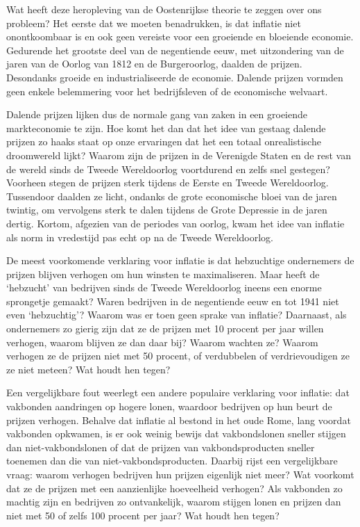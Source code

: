 \documentclass[
  a5paper,
  smalldemyvopaper,10pt,twoside,onecolumn,openright,extrafontsizes,hidelinks]{memoir}
\begin{document}
Wat heeft deze heropleving van de Oostenrijkse theorie te zeggen over
ons probleem? Het eerste dat we moeten benadrukken, is dat inflatie niet
onontkoombaar is en ook geen vereiste voor een groeiende en bloeiende
economie. Gedurende het grootste deel van de negentiende eeuw, met
uitzondering van de jaren van de Oorlog van 1812 en de Burgeroorlog,
daalden de prijzen. Desondanks groeide en industrialiseerde de economie.
Dalende prijzen vormden geen enkele belemmering voor het bedrijfsleven
of de economische welvaart.

Dalende prijzen lijken dus de normale gang van zaken in een groeiende
markteconomie te zijn. Hoe komt het dan dat het idee van gestaag dalende
prijzen zo haaks staat op onze ervaringen dat het een totaal
onrealistische droomwereld lijkt? Waarom zijn de prijzen in de Verenigde
Staten en de rest van de wereld sinds de Tweede Wereldoorlog voortdurend
en zelfs snel gestegen? Voorheen stegen de prijzen sterk tijdens de
Eerste en Tweede Wereldoorlog. Tussendoor daalden ze licht, ondanks de
grote economische bloei van de jaren twintig, om vervolgens sterk te
dalen tijdens de Grote Depressie in de jaren dertig. Kortom, afgezien
van de periodes van oorlog, kwam het idee van inflatie als norm in
vredestijd pas echt op na de Tweede Wereldoorlog.

De meest voorkomende verklaring voor inflatie is dat hebzuchtige
ondernemers de prijzen blijven verhogen om hun winsten te maximaliseren.
Maar heeft de `hebzucht' van bedrijven sinds de Tweede Wereldoorlog
ineens een enorme sprongetje gemaakt? Waren bedrijven in de negentiende
eeuw en tot 1941 niet even `hebzuchtig'? Waarom was er toen geen sprake
van inflatie? Daarnaast, als ondernemers zo gierig zijn dat ze de
prijzen met 10 procent per jaar willen verhogen, waarom blijven ze dan
daar bij? Waarom wachten ze? Waarom verhogen ze de prijzen niet met 50
procent, of verdubbelen of verdrievoudigen ze ze niet meteen? Wat houdt
hen tegen?

Een vergelijkbare fout weerlegt een andere populaire verklaring voor
inflatie: dat vakbonden aandringen op hogere lonen, waardoor bedrijven
op hun beurt de prijzen verhogen. Behalve dat inflatie al bestond in het
oude Rome, lang voordat vakbonden opkwamen, is er ook weinig bewijs dat
vakbondslonen sneller stijgen dan niet-vakbondslonen of dat de prijzen
van vakbondsproducten sneller toenemen dan die van
niet-vakbondsproducten. Daarbij rijst een vergelijkbare vraag: waarom
verhogen bedrijven hun prijzen eigenlijk niet meer? Wat voorkomt dat ze
de prijzen met een aanzienlijke hoeveelheid verhogen? Als vakbonden zo
machtig zijn en bedrijven zo ontvankelijk, waarom stijgen lonen en
prijzen dan niet met 50 of zelfs 100 procent per jaar? Wat houdt hen
tegen?
\end{document}
